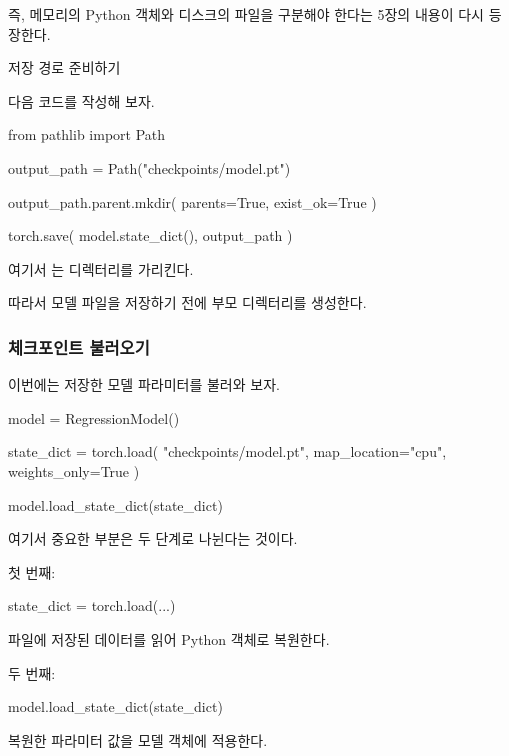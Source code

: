 즉, 메모리의 Python 객체와 디스크의 파일을 구분해야 한다는 5장의 내용이 다시 등장한다.

\begin{dhknote}
\begin{dhksmry}[centered]
저장 경로 준비하기
\end{dhksmry}
\end{dhknote}

다음 코드를 작성해 보자.

\begin{dhkcode}
from pathlib import Path

output_path = Path("checkpoints/model.pt")

output_path.parent.mkdir(
    parents=True,
    exist_ok=True
)

torch.save(
    model.state_dict(),
    output_path
)
\end{dhkcode}

여기서 는  디렉터리를 가리킨다.

따라서 모델 파일을 저장하기 전에 부모 디렉터리를 생성한다.

\subsubsection{체크포인트 불러오기}

이번에는 저장한 모델 파라미터를 불러와 보자.

\begin{dhkcode}
model = RegressionModel()

state_dict = torch.load(
    "checkpoints/model.pt",
    map_location="cpu",
    weights_only=True
)

model.load_state_dict(state_dict)
\end{dhkcode}

여기서 중요한 부분은 두 단계로 나뉜다는 것이다.

첫 번째:

\begin{dhkcode}
state_dict = torch.load(...)
\end{dhkcode}

파일에 저장된 데이터를 읽어 Python 객체로 복원한다.

두 번째:

\begin{dhkcode}
model.load_state_dict(state_dict)
\end{dhkcode}

복원한 파라미터 값을 모델 객체에 적용한다.

